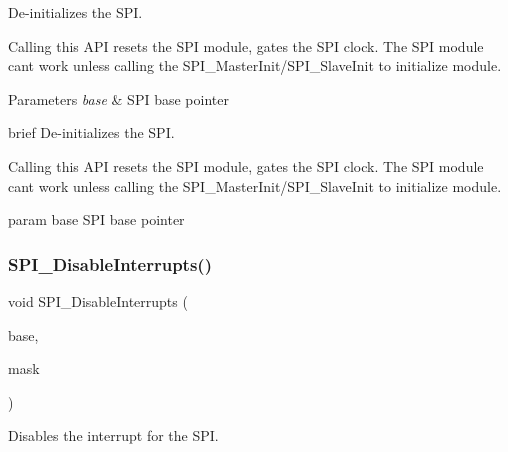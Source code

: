 De-\/initializes the S\+PI. 

Calling this A\+PI resets the S\+PI module, gates the S\+PI clock. The S\+PI module can\textquotesingle{}t work unless calling the S\+P\+I\+\_\+\+Master\+Init/\+S\+P\+I\+\_\+\+Slave\+Init to initialize module.


\begin{DoxyParams}{Parameters}
{\em base} & S\+PI base pointer\\
\hline
\end{DoxyParams}
brief De-\/initializes the S\+PI.

Calling this A\+PI resets the S\+PI module, gates the S\+PI clock. The S\+PI module can\textquotesingle{}t work unless calling the S\+P\+I\+\_\+\+Master\+Init/\+S\+P\+I\+\_\+\+Slave\+Init to initialize module.

param base S\+PI base pointer \mbox{\label{group__spi__driver_ga1c3de83156f45d3f91540a1ec5f92826}} 
\subsubsection{\texorpdfstring{SPI\_DisableInterrupts()}{SPI\_DisableInterrupts()}}
{\footnotesize\ttfamily void S\+P\+I\+\_\+\+Disable\+Interrupts (\begin{DoxyParamCaption}\item[{\mbox{\hyperlink{struct_s_p_i___type}{S\+P\+I\+\_\+\+Type}} $\ast$}]{base,  }\item[{uint32\+\_\+t}]{mask }\end{DoxyParamCaption})}



Disables the interrupt for the S\+PI. 


